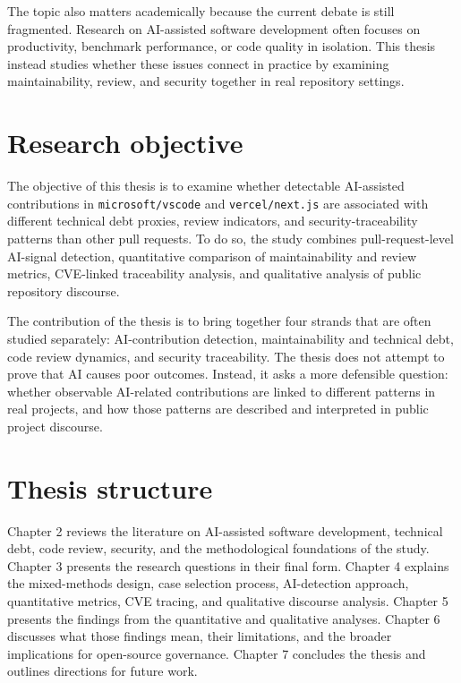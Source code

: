 The topic also matters academically because the current debate is still fragmented. Research on AI-assisted software development often focuses on productivity, benchmark performance, or code quality in isolation. This thesis instead studies whether these issues connect in practice by examining maintainability, review, and security together in real repository settings.

\section{Research objective}
The objective of this thesis is to examine whether detectable AI-assisted contributions in \texttt{microsoft/vscode} and \texttt{vercel/next.js} are associated with different technical debt proxies, review indicators, and security-traceability patterns than other pull requests. To do so, the study combines pull-request-level AI-signal detection, quantitative comparison of maintainability and review metrics, CVE-linked traceability analysis, and qualitative analysis of public repository discourse.

The contribution of the thesis is to bring together four strands that are often studied separately: AI-contribution detection, maintainability and technical debt, code review dynamics, and security traceability. The thesis does not attempt to prove that AI causes poor outcomes. Instead, it asks a more defensible question: whether observable AI-related contributions are linked to different patterns in real projects, and how those patterns are described and interpreted in public project discourse.

\section{Thesis structure}
Chapter 2 reviews the literature on AI-assisted software development, technical debt, code review, security, and the methodological foundations of the study. Chapter 3 presents the research questions in their final form. Chapter 4 explains the mixed-methods design, case selection process, AI-detection approach, quantitative metrics, CVE tracing, and qualitative discourse analysis. Chapter 5 presents the findings from the quantitative and qualitative analyses. Chapter 6 discusses what those findings mean, their limitations, and the broader implications for open-source governance. Chapter 7 concludes the thesis and outlines directions for future work.
